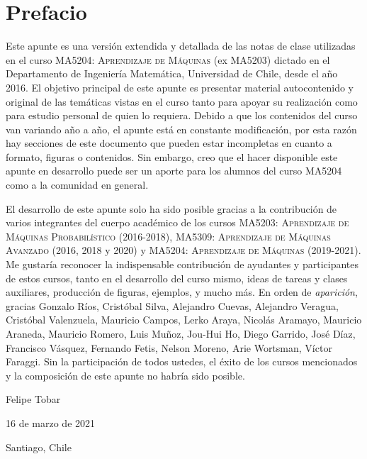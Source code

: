 \newpage
\section*{Prefacio}
Este apunte es una versión extendida y detallada de las notas de clase utilizadas en el curso \textsc{MA5204: Aprendizaje de Máquinas} (ex MA5203) dictado en el Departamento de Ingeniería Matemática, Universidad de Chile, desde el año 2016. El objetivo principal de este apunte es presentar material autocontenido y original de las temáticas vistas en el curso tanto para apoyar su realización como para estudio personal de quien lo requiera. Debido a que los contenidos del curso van variando año a año, el apunte está en constante modificación, por esta razón hay secciones de este documento que pueden estar incompletas en cuanto a formato, figuras o contenidos. Sin embargo, creo que el hacer disponible este apunte en desarrollo puede ser un aporte para los alumnos del curso MA5204 como a la comunidad en general.

El desarrollo de este apunte solo ha sido posible gracias a la contribución de varios integrantes del cuerpo académico de los cursos \textsc{MA5203: Aprendizaje de Máquinas Probabilístico} (2016-2018), \textsc{MA5309: Aprendizaje de Máquinas Avanzado} (2016, 2018 y 2020) y \textsc{MA5204: Aprendizaje de Máquinas} (2019-2021). Me gustaría reconocer la indispensable contribución de ayudantes y participantes de estos cursos, tanto en el desarrollo del curso mismo, ideas de tareas y clases auxiliares, producción de figuras, ejemplos, y mucho más. En orden de \emph{aparición}, gracias 
Gonzalo Ríos, 
Cristóbal Silva, 
Alejandro Cuevas, 
Alejandro Veragua, 
Cristóbal Valenzuela, 
Mauricio Campos, 
Lerko Araya, 
Nicolás Aramayo, 
Mauricio Araneda, 
Mauricio Romero, 
Luis Muñoz, 
Jou-Hui Ho, 
Diego Garrido, 
José Díaz, 
Francisco Vásquez, 
Fernando Fetis, 
Nelson Moreno, 
Arie Wortsman, 
Víctor Faraggi.
Sin la participación de todos ustedes, el éxito de los cursos mencionados y la composición de este apunte no habría sido posible.





\bigskip
\begin{flushright}
  Felipe Tobar\par
  16 de marzo de 2021\par
  Santiago, Chile
\end{flushright}
\newpage

